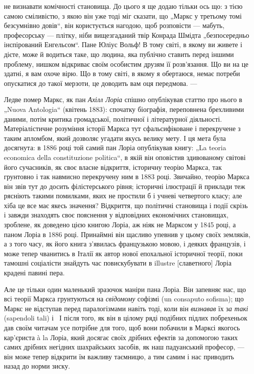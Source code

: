 \parcont{}  %
не визнавати комічності становища. До цього я ще додаю тільки
ось що: з тією самою сміливістю, з якою він уже тоді міг сказати,
що „Маркс у третьому томі безсумнівно довів“, він користується
нагодою, щоб розповісти — мабуть, професорську —
плітку, ніби вищезгаданий твір Конрада Шмідта „безпосередньо
інспірований Енгельсом“. Пане Юліус Вольф! В тому світі, в якому
ви живете і дієте, може й водиться таке, що людина, яка публічно
ставить перед іншими проблему, нишком відкриває своїм
особистим друзям її розв’язання. Що ви на це здатні, я вам охоче
вірю. Що в тому світі, в якому я обертаюся, немає потреби
опускатися до такої мерзоти, це доводить вам оця передмова. —

Ледве помер Маркс, як пан \emph{Ахілл Лоріа} спішно опублікував
статтю про нього в „Nuova Antologia“ (квітень 1883): спочатку
біографія, переповнена брехливими даними, потім критика
громадської, політичної і літературної діяльності. Матеріалістичне
розуміння історії Маркса тут сфальсифіковане і перекручене
з таким апломбом, який дозволяє угадати якусь велику
мету. І ця мета була досягнута: в 1886 році той самий пан
Лоріа опублікував книгу: „La teoria economica della constituzione
politica“, в якій він оповістив здивованому світові його сучасників,
як своє власне відкриття, історичну теорію Маркса, так
грунтовно і так навмисно перекручену ним в 1883 році. Звичайно,
теорію Маркса він звів тут до досить філістерського
рівня; історичні ілюстрації й приклади теж рясніють такими помилками,
яких не простили б і учневі четвертого класу; але
хіба це все має якесь значення? Відкриття, що політичні становища
і події скрізь і завжди знаходять своє пояснення у відповідних
економічних становищах, зроблене, як доведено цією книгою
Лоріа, аж ніяк не Марксом у 1845 році, а паном Лоріа
в 1886 році. Принаймні він щасливо упевнив у цьому своїх земляків,
а з того часу, як його книга з’явилась французькою мовою,
і деяких французів, і може тепер чванитись в Італії як
автор нової епохальної історичної теорії, поки тамошні соціалісти
знайдуть час повискубувати в illustre [славетного] Лоріа
крадені павині пера.

Але це тільки один маленький зразочок маніри пана Лоріа.
Він запевняє нас, що всі теорії Маркса грунтуються на \emph{свідомому}
софізмі (un consaputo sofisma); що Маркс не відступав
перед паралогізмами навіть тоді, коли він \emph{визнавав} їх з\emph{а такі}
(sapendoli tali) і~ І після того, як він в цілому ряді подібних
підлих побрехеньок дав своїм читачам усе потрібне для
того, щоб вони побачили в Марксі якогось кар’єриста à la Лоріа,
який досягає своїх дрібних ефектів за допомогою таких самих
дрібних негідних шахрайських засобів, як наш падуанський професор,
— він може тепер відкрити їм важливу таємницю, а тим
самим і нас приводить назад до норми зиску.

